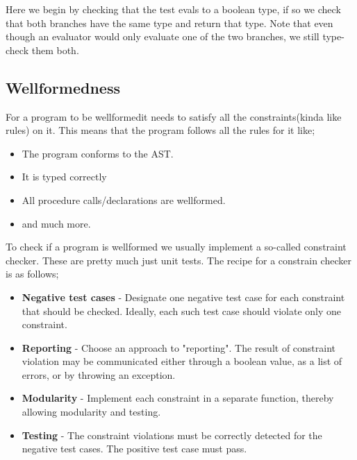         Here we begin by checking that the test evals to a boolean type, if so we check that both branches have the same type and return that type.
        Note that even though an evaluator would only evaluate one of the two branches, we still type-check them both.
        \subsection{Wellformedness}
            For a program to be \gls{wellformed}it needs to satisfy all the constraints(kinda like rules) on it. This means that the program follows all the rules 
            for it like; 
            \begin{itemize}
                \item The program conforms to the AST.
                \item It is typed correctly
                \item All procedure calls/declarations are wellformed.
                \item and much more.
            \end{itemize}
            To check if a program is wellformed we usually implement a so-called constraint checker. These are pretty much just unit tests.
            The recipe for a constrain checker is as follows;
            \begin{itemize}
                \item \textbf{Negative test cases} - Designate one negative test case for each constraint that should be checked. 
                Ideally, each such test case should violate only one constraint.
                \item \textbf{Reporting} - Choose an approach to "reporting". The result of constraint violation may be communicated either through
                                        a boolean value, as a list of errors, or by throwing an exception.
                \item \textbf{Modularity} - Implement each constraint in a separate function, thereby allowing modularity and testing.
                \item \textbf{Testing} - The constraint violations must be correctly detected for the negative test cases. The positive test case must pass.
            \end{itemize}

    